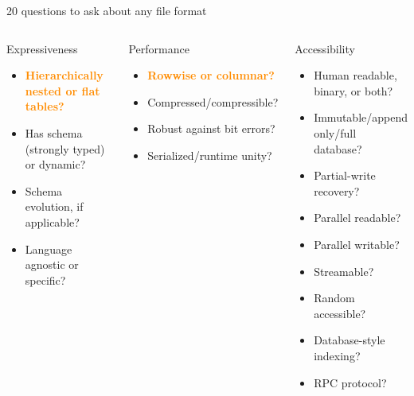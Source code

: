 \documentclass[aspectratio=169]{beamer}
\begin{document}
\begin{frame}{20 questions to ask about any file format}
\vspace{0.15 cm}
\small
\begin{columns}

\begin{block}{Expressiveness}
\vspace{-0.2 cm}
\begin{itemize}\setlength{\itemsep}{-0.05 cm}
\item \textcolor{darkorange}{\bf Hierarchically nested or flat tables?}
\item Has schema (strongly typed) or dynamic?
\item Schema evolution, if applicable?
\item Language agnostic or specific?
\end{itemize}
\end{block}

\vspace{0.5 cm}

\begin{block}{Performance}
\vspace{-0.2 cm}
\begin{itemize}\setlength{\itemsep}{-0.05 cm}
\item \textcolor{darkorange}{\bf Rowwise or columnar?}
\item Compressed/compressible?
\item Robust against bit errors?
\item Serialized/runtime unity?
\end{itemize}
\end{block}


\begin{block}{Accessibility}
\vspace{-0.2 cm}
\begin{itemize}\setlength{\itemsep}{-0.05 cm}
\item Human readable, binary, or both?
\item Immutable/append only/full database?
\item Partial-write recovery?
\item Parallel readable?
\item Parallel writable?
\item Streamable?
\item Random accessible?
\item Database-style indexing?
\item RPC protocol?
\end{itemize}
\end{block}


\end{columns}
\end{frame}
\end{document}
